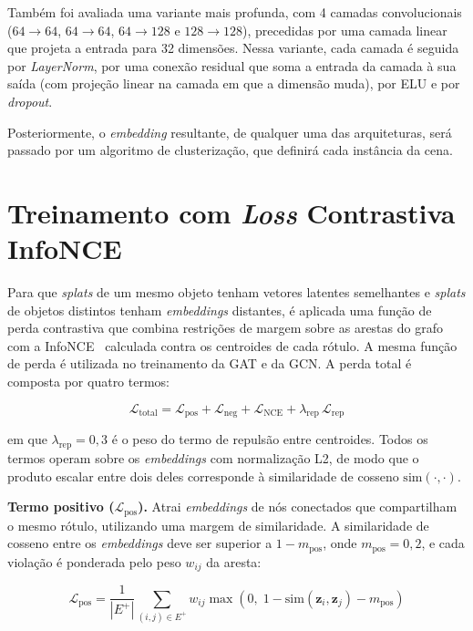 Também foi avaliada uma variante mais profunda, com 4 camadas convolucionais ($64 \rightarrow 64$, $64 \rightarrow 64$, $64 \rightarrow 128$ e $128 \rightarrow 128$), precedidas por uma camada linear que projeta a entrada para 32 dimensões. Nessa variante, cada camada é seguida por \textit{LayerNorm}, por uma conexão residual que soma a entrada da camada à sua saída (com projeção linear na camada em que a dimensão muda), por ELU e por \textit{dropout}.

Posteriormente, o \textit{embedding} resultante, de qualquer uma das arquiteturas, será passado por um algoritmo de clusterização, que definirá cada instância da cena.


\section{Treinamento com \emph{Loss} Contrastiva InfoNCE}

Para que \emph{splats} de um mesmo objeto tenham vetores latentes semelhantes e \emph{splats} de objetos distintos tenham \textit{embeddings} distantes, é aplicada uma função de perda contrastiva que combina restrições de margem sobre as arestas do grafo~\cite{hadsell2006dimensionality} com a InfoNCE~\cite{oord2018representation} calculada contra os centroides de cada rótulo. A mesma função de perda é utilizada no treinamento da GAT e da GCN. A perda total é composta por quatro termos:

\[
\mathcal{L}_{\text{total}} = \mathcal{L}_{\text{pos}} + \mathcal{L}_{\text{neg}} + \mathcal{L}_{\text{NCE}} + \lambda_{\text{rep}}\,\mathcal{L}_{\text{rep}}
\]

em que $\lambda_{\text{rep}} = 0{,}3$ é o peso do termo de repulsão entre centroides. Todos os termos operam sobre os \textit{embeddings} com normalização L2, de modo que o produto escalar entre dois deles corresponde à similaridade de cosseno $\text{sim}(\cdot, \cdot)$.

\noindent\textbf{Termo positivo ($\mathcal{L}_{\text{pos}}$).} Atrai \textit{embeddings} de nós conectados que compartilham o mesmo rótulo, utilizando uma margem de similaridade. A similaridade de cosseno entre os \textit{embeddings} deve ser superior a $1 - m_{\text{pos}}$, onde $m_{\text{pos}} = 0{,}2$, e cada violação é ponderada pelo peso $w_{ij}$ da aresta:

\[
\mathcal{L}_{\text{pos}} = \frac{1}{|E^{+}|} \sum_{(i,j) \in E^{+}} w_{ij} \max\left(0,\; 1 - \text{sim}(\mathbf{z}_i, \mathbf{z}_j) - m_{\text{pos}}\right)
\]

